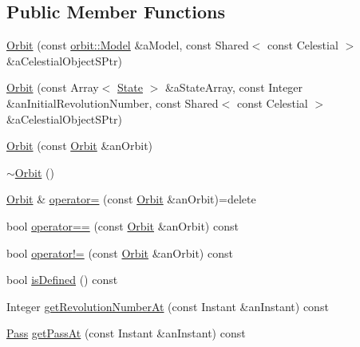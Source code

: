\subsection*{Public Member Functions}
\begin{DoxyCompactItemize}
\item 
\hyperlink{classostk_1_1astro_1_1trajectory_1_1_orbit_aaccbf7c99f454ba6acd8aff68a2137bf}{Orbit} (const \hyperlink{classostk_1_1astro_1_1trajectory_1_1orbit_1_1_model}{orbit\+::\+Model} \&a\+Model, const Shared$<$ const Celestial $>$ \&a\+Celestial\+Object\+S\+Ptr)
\item 
\hyperlink{classostk_1_1astro_1_1trajectory_1_1_orbit_ac5396ec3866ad7afe7384bbfc4d41339}{Orbit} (const Array$<$ \hyperlink{classostk_1_1astro_1_1trajectory_1_1_state}{State} $>$ \&a\+State\+Array, const Integer \&an\+Initial\+Revolution\+Number, const Shared$<$ const Celestial $>$ \&a\+Celestial\+Object\+S\+Ptr)
\item 
\hyperlink{classostk_1_1astro_1_1trajectory_1_1_orbit_ac44603858b8379e0f2ded4236855c162}{Orbit} (const \hyperlink{classostk_1_1astro_1_1trajectory_1_1_orbit}{Orbit} \&an\+Orbit)
\item 
\hyperlink{classostk_1_1astro_1_1trajectory_1_1_orbit_aad56a0293156188474bcf1b78e55e249}{$\sim$\+Orbit} ()
\item 
\hyperlink{classostk_1_1astro_1_1trajectory_1_1_orbit}{Orbit} \& \hyperlink{classostk_1_1astro_1_1trajectory_1_1_orbit_a1a6ea873bd7728fcd1fdf028c5b2c026}{operator=} (const \hyperlink{classostk_1_1astro_1_1trajectory_1_1_orbit}{Orbit} \&an\+Orbit)=delete
\item 
bool \hyperlink{classostk_1_1astro_1_1trajectory_1_1_orbit_aa3fdab43c081059d268984dca953cb7d}{operator==} (const \hyperlink{classostk_1_1astro_1_1trajectory_1_1_orbit}{Orbit} \&an\+Orbit) const
\item 
bool \hyperlink{classostk_1_1astro_1_1trajectory_1_1_orbit_a9c376b2163bc4fcca62abccaf03014d2}{operator!=} (const \hyperlink{classostk_1_1astro_1_1trajectory_1_1_orbit}{Orbit} \&an\+Orbit) const
\item 
bool \hyperlink{classostk_1_1astro_1_1trajectory_1_1_orbit_abb1c3d611881104558aa93c9eb948455}{is\+Defined} () const
\item 
Integer \hyperlink{classostk_1_1astro_1_1trajectory_1_1_orbit_aa8ca190bd7b20f4654e0338660f57907}{get\+Revolution\+Number\+At} (const Instant \&an\+Instant) const
\item 
\hyperlink{classostk_1_1astro_1_1trajectory_1_1orbit_1_1_pass}{Pass} \hyperlink{classostk_1_1astro_1_1trajectory_1_1_orbit_a6cf47ea28cb2fb72a2659284a997b3b5}{get\+Pass\+At} (const Instant \&an\+Instant) const

\end{DoxyCompactItemize}
